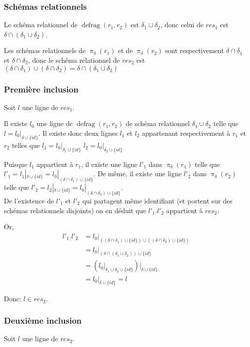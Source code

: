 \documentclass[french]{article}
\DeclareMathOperator{\proj}{\pi}
\DeclareMathOperator{\defrag}{defrag}
\newcommand{\projDelta}{\proj_{\delta}}
\newcommand{\cip}{\cup \{id\}}
\begin{document}
\subsubsection*{Schémas relationnels}
Le schéma relationnel de $\defrag(r_1, r_2)$
est $\delta_1 \cup \delta_2$, donc celui de
${res}_1$ est $\delta \cap (\delta_1 \cup \delta_2)$.

Les schémas relationnels de $\projDelta(r_1)$ et de $\projDelta(r_2)$
sont respectivement $\delta \cap \delta_1$ et $\delta \cap \delta_2$,
donc le schéma relationnel de ${res}_2$ est 
$(\delta \cap \delta_1) \cup (\delta \cap \delta_2) = \delta \cap (\delta_1 \cup \delta_2)$


\subsubsection*{Première inclusion}
Soit $l$ une ligne de ${res}_1$.

Il existe $l_0$ une ligne de $\defrag(r_1, r_2)$
de schéma relationnel $\delta_1 \cup \delta_2$
telle que $l = l_0|_{\delta \cip}$.
Il existe donc deux lignes $l_1$ et $l_2$
appartenant respectivement à $r_1$ et $r_2$
telles que
$l_1 = l_0|_{\delta_1 \cip}$
$l_2 = l_0|_{\delta_2 \cip}$

Puisque $l_1$ appartient à $r_1$,
il existe une ligne
$l'_1$ dans $\projDelta(r_1)$
telle que
$l'_1 = l_1|_{\delta \cip} = l_0|_{(\delta \cap \delta_1) \cip}$.
De même,
il existe une ligne
$l'_2$ dans $\projDelta(r_2)$
telle que
$l'_2 = l_2|_{\delta \cip} = l_0|_{(\delta \cap \delta_2) \cip}$. \\

De l'existence de $l'_1$ et 
$l'_2$ qui partagent même identifiant
(et portent sur des schémas relationnels
disjoints)
on en déduit que $l'_1 . l'_2 $ appartient à ${res}_2$.

Or,
\begin{align*}
l'_1 . l'_2 & = l_0|_{((\delta \cap \delta_1) \cip) \cup ((\delta \cap \delta_2) \cip)} \\
	& = l_0|_{(\delta \cap (\delta_1\cup\delta_2)) \cip} \\
	& = \left( l_0|_{\delta_1 \cup \delta_2 \cip} \right)|_{\delta \cip} \\
	& = l_0|_{\delta \cip} = l
\end{align*}

Donc: $l \in {res}_2$.

\subsubsection*{Deuxième inclusion}
Soit $l$ une ligne de ${res}_2$.
\end{document}
